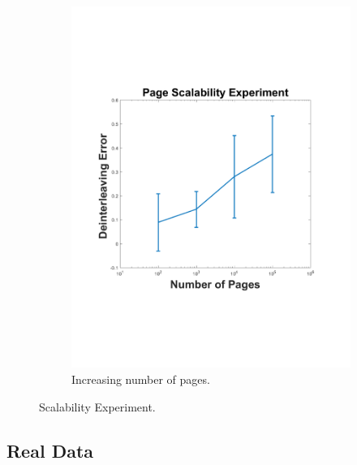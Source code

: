 \documentclass[conference]{IEEEtran}
\begin{document}
\begin{figure}
\begin{subfigure}[b]{0.45\textwidth}
		\includegraphics[width=\textwidth]{./img/incpages2}
		\caption{Increasing number of pages.}
		\label{fig:incpages}
	\end{subfigure}
	\caption{Scalability Experiment.}%
	\end{figure}
	
	\subsection{Real Data}
	
	
	
	
	
\end{document}
